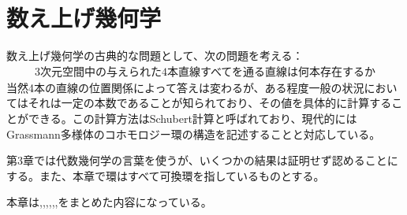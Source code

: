 \documentclass{ltjsreport}
\begin{document}
  \chapter{数え上げ幾何学}

  数え上げ幾何学の古典的な問題として、次の問題を考える：
  \begin{align*}
    \text{3次元空間中の与えられた4本直線すべてを通る直線は何本存在するか}
  \end{align*}
  当然4本の直線の位置関係によって答えは変わるが、ある程度一般の状況においてはそれは一定の本数であることが知られており、その値を具体的に計算することができる。この計算方法はSchubert計算と呼ばれており、現代的にはGrassmann多様体のコホモロジー環の構造を記述することと対応している。

  第3章では代数幾何学の言葉を使うが、いくつかの結果は証明せず認めることにする。また、本章で環はすべて可換環を指しているものとする。

  本章は\cite{enu_geo},\cite{young_tableau},\cite{AM},\cite{RH},\cite{FA},\cite{HA},\cite{3264}をまとめた内容になっている。

  

  

  
\end{document}
